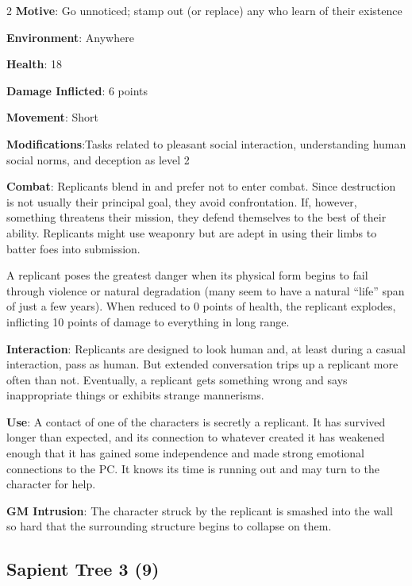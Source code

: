\begin{multicols}{2}
\textbf{Motive}: Go unnoticed; stamp out (or replace) any who learn of their existence

\textbf{Environment}: Anywhere

\textbf{Health}: 18

\textbf{Damage Inflicted}: 6 points

\textbf{Movement}: Short

\textbf{Modifications}:Tasks related to pleasant social interaction, understanding human social norms, and deception as level 2

\textbf{Combat}: Replicants blend in and prefer not to enter combat. Since destruction is not usually their principal goal, they avoid confrontation. If, however, something threatens their mission, they defend themselves to the best of their ability. Replicants might use weaponry but are adept in using their limbs to batter foes into submission.

A replicant poses the greatest danger when its physical form begins to fail through violence or natural degradation (many seem to have a natural “life” span of just a few years). When reduced to 0 points of health, the replicant explodes, inflicting 10 points of damage to everything in long range.

\textbf{Interaction}: Replicants are designed to look human and, at least during a casual interaction, pass as human. But extended conversation trips up a replicant more often than not. Eventually, a replicant gets something wrong and says inappropriate things or exhibits strange mannerisms.

\textbf{Use}: A contact of one of the characters is secretly a replicant. It has survived longer than expected, and its connection to whatever created it has weakened enough that it has gained some independence and made strong emotional connections to the PC. It knows its time is running out and may turn to the character for help.

\textbf{GM Intrusion}: The character struck by the replicant is smashed into the wall so hard that the surrounding structure begins to collapse on them.

\subsection{Sapient Tree 3 (9)}


\end{multicols}
